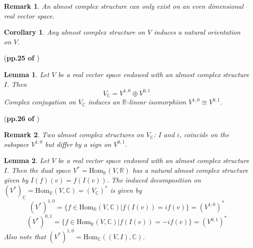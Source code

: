 \documentclass{book}
\numberwithin{equation}{subsection} %
\newtheorem{lemma}{Lemma}[section]
\newtheorem{remark}{Remark}[section]
\newtheorem{coro}{Corollary}[section]
\theoremstyle{definition}
\begin{document}
\begin{remark}
    An almost complex structure can only exist on an even dimensional
    real vector space.
\end{remark}

\begin{coro}
    Any almost complex structure on $V$ induces a natural orientation
    on $V$.
\end{coro}
(\textbf{pp.25 of \cite{book}})

\begin{lemma}
    Let $V$ be a real vector space endowed with an almost complex
    structure $I$. Then
    $$ V_{\mathbb{C}} = V^{1,0}\oplus V^{0,1}$$
    Complex conjugation on $V_{\mathbb{C}}$ induces an $\mathbb{R}$-linear
    isomorphism $V^{1,0}\cong V^{0,1}$.
\end{lemma}
(\textbf{pp.26 of \cite{book}})

\begin{remark}
    Two almost complex structures on $V_{\mathbb{C}}$: $I$ and $i$,
    coincide on the subspace $V^{1,0}$ but differ by a sign on
    $V^{0,1}$.
\end{remark}

\begin{lemma}
    Let $V$ be a real vector space endowed with an almost complex
    structure $I$. Then the dual space 
    $V^*=\text{Hom}_{\mathbb{R}}(V,\mathbb{R})$ has a natural almost
    complex structure given by $I(f)(v)=f(I(v))$. The induced 
    decomposition on 
    $(V^*)_{\mathbb{C}}=\text{Hom}_{\mathbb{R}}(V,\mathbb{C})
    = (V_{\mathbb{C}})^*$ is given by
    $$ (V^*)^{1,0} = \{f\in \text{Hom}_{\mathbb{R}}(V,\mathbb{C}) |
        f(I(v)) = i f(v) \} = (V^{1,0})^*$$
    $$ (V^*)^{0,1} = \{f\in \text{Hom}_{\mathbb{R}}(V,\mathbb{C}) |
        f(I(v)) = -i f(v) \} = (V^{0,1})^*$$
    Also note that $(V^*)^{1,0} = 
        \text{Hom}_{\mathbb{C}}((V,I),\mathbb{C})$.
\end{lemma}
\end{document}

